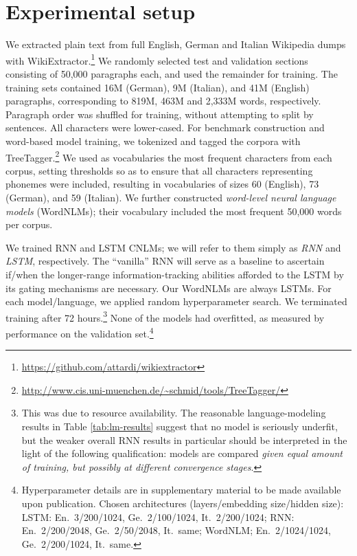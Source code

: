 \section{Experimental setup}
\label{sec:setup}

We extracted plain text from full English, German and Italian
Wikipedia dumps with
WikiExtractor.\footnote{\url{https://github.com/attardi/wikiextractor}}
We randomly selected test and validation sections consisting of 50,000
paragraphs each, and used the remainder for training. The training
sets contained 16M (German), 9M (Italian), and 41M (English)
paragraphs, corresponding to 819M, 463M and 2,333M words,
respectively. Paragraph order was shuffled for training, without
attempting to split by sentences. All characters were lower-cased.
For benchmark construction and word-based model training, we tokenized
and tagged the corpora with
TreeTagger.\footnote{\url{http://www.cis.uni-muenchen.de/~schmid/tools/TreeTagger/}}
We used as vocabularies the most frequent characters from each corpus,
setting thresholds so as to ensure that all characters representing
phonemes were included, resulting in vocabularies of sizes 60
(English), 73 (German), and 59 (Italian).  We further constructed
\emph{word-level neural language models} (WordNLMs); their vocabulary
included the most frequent 50,000 words per corpus.

We trained RNN and LSTM CNLMs; we will refer to them simply as
\emph{RNN} and \emph{LSTM}, respectively. The ``vanilla'' RNN will
serve as a baseline to ascertain if/when the longer-range
information-tracking abilities afforded to the LSTM by its gating
mechanisms are necessary. Our WordNLMs are always LSTMs.  For each
model/language, we applied random hyperparameter search.  We
terminated training after 72 hours.\footnote{This was due to resource
  availability. The reasonable language-modeling results in Table
  \ref{tab:lm-results} suggest that no model is seriously underfit,
  but the weaker overall RNN results in particular should be
  interpreted in the light of the following qualification: models are
  compared \emph{given equal amount of training, but possibly at
    different convergence stages}.} None of the models had overfitted,
as measured by performance on the validation
set.\footnote{Hyperparameter details are in supplementary material to
  be made available upon publication. Chosen architectures
  (layers/embedding size/hidden size): LSTM: En.~3/200/1024,
  Ge.~2/100/1024, It.~2/200/1024; RNN: En.~2/200/2048, Ge.~2/50/2048,
  It.~same; WordNLM; En.~2/1024/1024, Ge.~2/200/1024, It.~same.}

